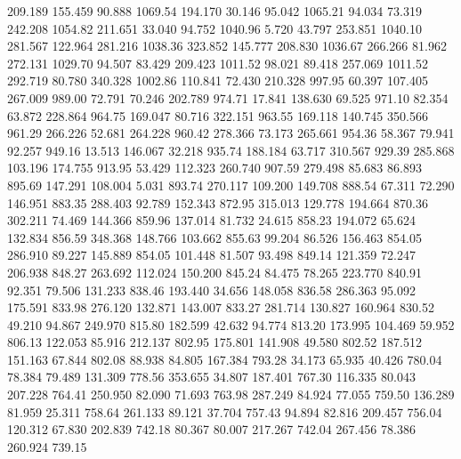  209.189  155.459   90.888      1069.54
 194.170   30.146   95.042      1065.21
  94.034   73.319  242.208      1054.82
 211.651   33.040   94.752      1040.96
   5.720   43.797  253.851      1040.10
 281.567  122.964  281.216      1038.36
 323.852  145.777  208.830      1036.67
 266.266   81.962  272.131      1029.70
  94.507   83.429  209.423      1011.52
  98.021   89.418  257.069      1011.52
 292.719   80.780  340.328      1002.86
 110.841   72.430  210.328       997.95
  60.397  107.405  267.009       989.00
  72.791   70.246  202.789       974.71
  17.841  138.630   69.525       971.10
  82.354   63.872  228.864       964.75
 169.047   80.716  322.151       963.55
 169.118  140.745  350.566       961.29
 266.226   52.681  264.228       960.42
 278.366   73.173  265.661       954.36
  58.367   79.941   92.257       949.16
  13.513  146.067   32.218       935.74
 188.184   63.717  310.567       929.39
 285.868  103.196  174.755       913.95
  53.429  112.323  260.740       907.59
 279.498   85.683   86.893       895.69
 147.291  108.004    5.031       893.74
 270.117  109.200  149.708       888.54
  67.311   72.290  146.951       883.35
 288.403   92.789  152.343       872.95
 315.013  129.778  194.664       870.36
 302.211   74.469  144.366       859.96
 137.014   81.732   24.615       858.23
 194.072   65.624  132.834       856.59
 348.368  148.766  103.662       855.63
  99.204   86.526  156.463       854.05
 286.910   89.227  145.889       854.05
 101.448   81.507   93.498       849.14
 121.359   72.247  206.938       848.27
 263.692  112.024  150.200       845.24
  84.475   78.265  223.770       840.91
  92.351   79.506  131.233       838.46
 193.440   34.656  148.058       836.58
 286.363   95.092  175.591       833.98
 276.120  132.871  143.007       833.27
 281.714  130.827  160.964       830.52
  49.210   94.867  249.970       815.80
 182.599   42.632   94.774       813.20
 173.995  104.469   59.952       806.13
 122.053   85.916  212.137       802.95
 175.801  141.908   49.580       802.52
 187.512  151.163   67.844       802.08
  88.938   84.805  167.384       793.28
  34.173   65.935   40.426       780.04
  78.384   79.489  131.309       778.56
 353.655   34.807  187.401       767.30
 116.335   80.043  207.228       764.41
 250.950   82.090   71.693       763.98
 287.249   84.924   77.055       759.50
 136.289   81.959   25.311       758.64
 261.133   89.121   37.704       757.43
  94.894   82.816  209.457       756.04
 120.312   67.830  202.839       742.18
  80.367   80.007  217.267       742.04
 267.456   78.386  260.924       739.15
